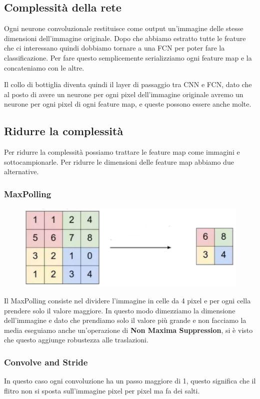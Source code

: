 \subsection{Complessità della rete}
Ogni neurone convoluzionale restituisce come output un'immagine delle stesse dimensioni dell'immagine originale. Dopo che abbiamo estratto tutte le feature che ci interessano quindi dobbiamo tornare a una FCN per poter fare la classificazione. Per fare questo semplicemente serializziamo ogni feature map e la concateniamo con le altre.

Il collo di bottiglia diventa quindi il layer di passaggio tra CNN e FCN, dato che al posto di avere un neurone per ogni pixel dell'immagine originale avremo un neurone per ogni pixel di ogni feature map, e queste possono essere anche molte.

\subsection{Ridurre la complessità}
Per ridurre la complessità possiamo trattare le feature map come immagini e sottocampionarle. Per ridurre le dimensioni delle feature map abbiamo due alternative.

\subsubsection{MaxPolling}
\begin{figure}
	\vspace{-.5cm}
	\centering
	\includegraphics[width=.9\linewidth]{Picture/MaxPolling}
\end{figure}
Il MaxPolling consiste nel dividere l'immagine in celle da 4 pixel e per ogni cella prendere solo il valore maggiore. In questo modo dimezziamo la dimensione dell'immagine e dato che prendiamo solo il valore più grande e non facciamo la media eseguiamo anche un'operazione di \textbf{Non Maxima Suppression}, si è visto che questo aggiunge robustezza alle traslazioni.

\subsubsection{Convolve and Stride}
In questo caso ogni convoluzione ha un passo maggiore di 1, questo significa che il flitro non si sposta sull'immagine pixel per pixel ma fa dei salti.

